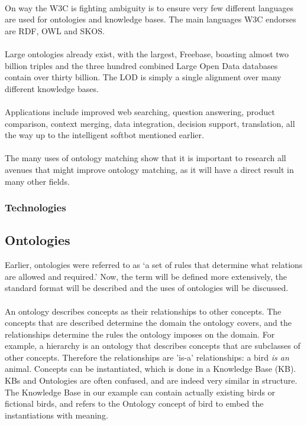 \documentclass{article}
\begin{document}
 \paragraph{}
 On way the W3C is fighting ambiguity is to ensure very few different languages are used for ontologies and knowledge bases. The main languages W3C endorses are RDF, OWL and SKOS\cite{rdf, owl, skos}. 
 \paragraph{}
 Large ontologies already exist, with the largest, Freebase, boasting almost two billion triples and the three hundred combined Large Open Data databases contain over thirty billion\cite{dbpedia, lod}. The LOD is simply a single alignment over many different knowledge bases.
 \paragraph{}
 Applications include improved web searching, question answering, product comparison, context merging, data integration, decision support, translation, all the way up to the intelligent softbot mentioned earlier. \cite{schreiber, future}
 \paragraph{}
 The many uses of ontology matching show that it is important to research all avenues that might improve ontology matching, as it will have a direct result in many other fields.
 \subsubsection{Technologies}
 
 \subsection{Ontologies}
 Earlier, ontologies were referred to as `a set of rules that determine what relations are allowed and required.' Now, the term will be defined more extensively, the standard format will be described and the uses of ontologies will be discussed.
 \paragraph{}
 An ontology describes concepts as their relationships to other concepts. The concepts that are described determine the domain the ontology covers, and the relationships determine the rules the ontology imposes on the domain. For example, a hierarchy is an ontology that describes concepts that are subclasses of other concepts. Therefore the relationships are 'is-a' relationships: a bird \emph{is an} animal.
 Concepts can be instantiated, which is done in a Knowledge Base (KB). KBs and Ontologies are often confused, and are indeed very similar in structure. The Knowledge Base in our example can contain actually existing birds or fictional birds, and refers to the Ontology concept of bird to embed the instantiations with meaning\cite{ontologyGuru}.
 
\end{document}
